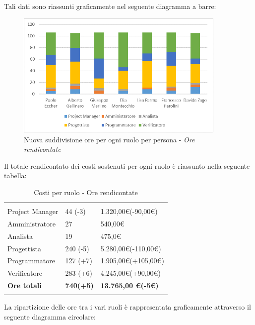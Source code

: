 Tali dati sono riassunti graficamente nel seguente diagramma a barre:
\begin{figure}[H] 
	\centering 
	\includegraphics[width=0.9\textwidth]{images/BarreSoloRendicontatoNuovo.png} 
	\caption{Nuova suddivisione ore per ogni ruolo per persona - \textit{Ore rendicontate}}
	\label{BarreRendicontate}
\end{figure}

Il totale rendicontato dei costi sostenuti per ogni ruolo è riassunto nella seguente tabella:
\begin{table}[H]
	\centering
	\begin{tabular}{|p{4cm}|C{4cm}|C{4cm}|}
		
		 & &\\
		Project Manager & 44 (-3) & 1.320,00\euro (-90,00\euro) \\
		\hline
		Amministratore& 27 & 540,00\euro \\
		\hline
		Analista & 19 & 475,0\euro \\
		\hline
		Progettista & 240 (-5) & 5.280,00\euro (-110,00\euro) \\
		\hline
		Programmatore & 127 (+7) & 1.905,00\euro (+105,00\euro) \\
		\hline
		Verificatore & 283 (+6) & 4.245,00\euro (+90,00\euro)\\
		\hline
		\textbf{Ore totali} & \textbf{740(+5)} & \textbf{13.765,00 \euro (-5\euro)} \\
	\end{tabular}
	\caption{Costi per ruolo - Ore rendicontate}
\end{table}

La ripartizione delle ore tra i vari ruoli è rappresentata graficamente attraverso il seguente diagramma circolare:

